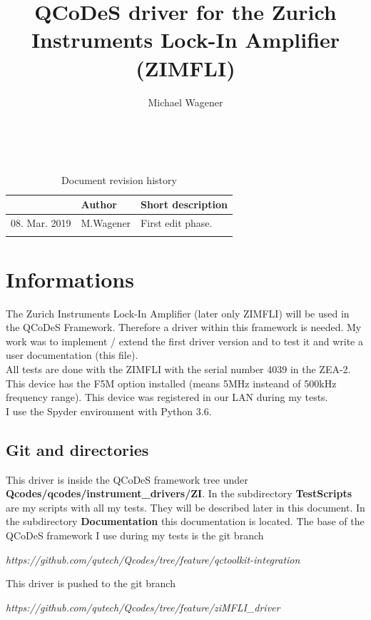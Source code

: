 \documentclass[11pt]{article} %
\title{QCoDeS driver for the Zurich Instruments Lock-In Amplifier (ZIMFLI)}
\author{Michael Wagener}
\begin{document}
\maketitle

\tableofcontents %

\ \\

\begin{longtable}{|p{2.7cm}|p{2.6cm}|p{10.3cm}|}
\caption{Document revision history} \\
\hline\rowcolor{rowcolor}{\bf Date} & {\bf Author} & {\bf Short description} \\
\endfirsthead
\hline
08. Mar. 2019 & M.Wagener & First edit phase. \\ \hline
 &  &  \\ \hline
\end{longtable}


\clearpage

\section{Informations}

The Zurich Instruments Lock-In Amplifier (later only ZIMFLI) will be used in the QCoDeS Framework. Therefore a driver within this framework is needed.
My work was to implement / extend the first driver version and to test it and write a user documentation (this file). \\[0.5em]
%
All tests are done with the ZIMFLI with the serial number 4039 in the ZEA-2. This device has the F5M option installed (means 5MHz insteand of 500kHz frequency range). This device was registered in our LAN during my tests. \\[0.5em]
%
I use the Spyder environment with Python 3.6.

\subsection{Git and directories}

This driver is inside the QCoDeS framework tree under {\bf Qcodes/qcodes/instrument\_drivers/ZI}. In the subdirectory {\bf TestScripts} are my scripts with all my tests. They will be described later in this document. In the subdirectory {\bf Documentation} this documentation is located. The base of the QCoDeS framework I use during my tests is the git branch \\
\centerline{\it https://github.com/qutech/Qcodes/tree/feature/qctoolkit-integration}
This driver is pushed to the git branch \\
\centerline{\it https://github.com/qutech/Qcodes/tree/feature/ziMFLI\_driver}
\end{document}
